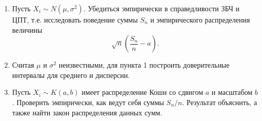 \begin{enumerate}
	\item Пусть $X_i \sim N(\mu, \sigma^2)$. Убедиться эмпирически в справедливости
     ЗБЧ и ЦПТ, т.е. исследовать поведение суммы $S_n$ и эмпирического распределения
     величины
	\begin{equation*}
	\sqrt{n} \left( \frac{S_n}{n} - a \right).
	\end{equation*}
	\item Считая $ \mu $ и $ \sigma^2 $ неизвестными, для пункта 1 построить
     доверительные интервалы для среднего и дисперсии.
	\item Пусть $ X_i \sim K(a, b) $ имеет распределение Коши со сдвигом $ a $ и
     масштабом $ b $. Проверить эмпирически, как ведут себя суммы $S_n/n$.
     Результат объяснить, а также найти закон распределения данных сумм.
\end{enumerate}

